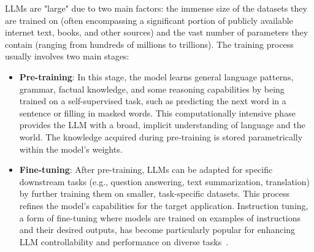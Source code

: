 LLMs are "large" due to two main factors: the immense size of the datasets they are trained on (often encompassing a significant portion of publicly available internet text, books, and other sources) and the vast number of parameters they contain (ranging from hundreds of millions to trillions). The training process usually involves two main stages:
\begin{itemize}
    \item \textbf{Pre-training}: In this stage, the model learns general language patterns, grammar, factual knowledge, and some reasoning capabilities by being trained on a self-supervised task, such as predicting the next word in a sentence or filling in masked words. This computationally intensive phase provides the LLM with a broad, implicit understanding of language and the world. The knowledge acquired during pre-training is stored parametrically within the model's weights.
    \item \textbf{Fine-tuning}: After pre-training, LLMs can be adapted for specific downstream tasks (e.g., question answering, text summarization, translation) by further training them on smaller, task-specific datasets. This process refines the model's capabilities for the target application. Instruction tuning, a form of fine-tuning where models are trained on examples of instructions and their desired outputs, has become particularly popular for enhancing LLM controllability and performance on diverse tasks~\cite{DBLP:journals/corr/abs-2210-11416}.
\end{itemize}

